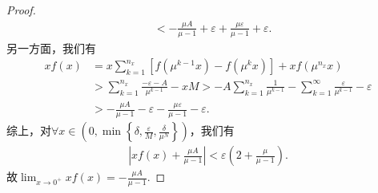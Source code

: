 \documentclass[../../main.tex]{subfiles}%
\begin{document}
\begin{proof}
\begin{align*}
&< -\frac{\mu A}{\mu - 1} + \varepsilon + \frac{\mu \varepsilon}{\mu - 1} + \varepsilon.
\end{align*}
另一方面，我们有
\begin{align*}
xf\left( x \right) &= x\sum_{k=1}^{n_x} \left[ f\left( \mu^{k-1}x \right) - f\left( \mu^k x \right) \right] + xf\left( \mu^{n_x} x \right) \\
&> \sum_{k=1}^{n_x} \frac{-\varepsilon - A}{\mu^{k-1}} - xM > -A\sum_{k=1}^{n_x} \frac{1}{\mu^{k-1}} - \sum_{k=1}^{\infty} \frac{\varepsilon}{\mu^{k-1}} - \varepsilon \\
&> -\frac{\mu A}{\mu - 1} - \varepsilon - \frac{\mu \varepsilon}{\mu - 1} - \varepsilon.
\end{align*}
综上，对$\forall x \in \left( 0,\min \left\{ \delta, \frac{\varepsilon}{M}, \frac{\delta}{\mu^N} \right\} \right)$，我们有
\begin{align*}
\left| xf\left( x \right) + \frac{\mu A}{\mu - 1} \right| < \varepsilon \left( 2 + \frac{\mu}{\mu - 1} \right).
\end{align*}
故$\lim_{x \to 0^+} xf\left( x \right) = -\frac{\mu A}{\mu - 1}.$

\end{proof}
\end{document}
